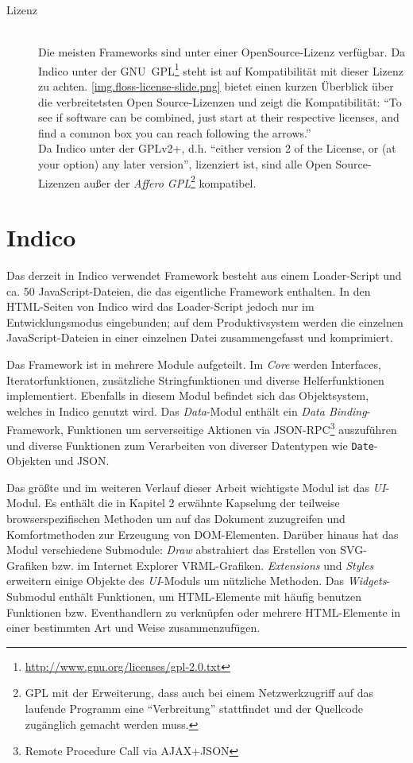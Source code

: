 \begin{description}
\item[Lizenz] \hfill \\
Die meisten Frameworks sind unter einer OpenSource-Lizenz verfügbar.
Da Indico unter der
GNU~GPL\footnote{\href{http://www.gnu.org/licenses/gpl-2.0.txt}{http://www.gnu.org/licenses/gpl-2.0.txt}}
steht ist auf Kompatibilität mit dieser Lizenz zu achten. \autoref{img.floss-license-slide.png}
bietet einen kurzen Überblick über die verbreitetsten Open Source-Lizenzen und zeigt die
Kompatibilität: \enquote{To see if software can be combined, just start at their respective
licenses, and find a common box you can reach following the arrows.} \citep{osslic} \\
Da Indico unter der GPLv2+, d.h. \enquote{either version 2 of the License, or (at your option) any
later version}, lizenziert ist, sind alle Open Source-Lizenzen außer der \emph{Affero
GPL}\footnote{GPL mit der Erweiterung, dass auch bei einem Netzwerkzugriff auf das laufende Programm
eine \enquote{Verbreitung} stattfindet und der Quellcode zugänglich gemacht werden muss.}
kompatibel.
\end{description}



\section{Indico}
Das derzeit in Indico verwendet Framework besteht aus einem Loader-Script und ca. 50
JavaScript-Dateien, die das eigentliche Framework enthalten. In den HTML-Seiten von Indico wird das
Loader-Script jedoch nur im Entwicklungsmodus eingebunden; auf dem Produktivsystem werden die
einzelnen JavaScript-Dateien in einer einzelnen Datei zusammengefasst und komprimiert.

Das Framework ist in mehrere Module aufgeteilt. Im \emph{Core} werden Interfaces,
Iteratorfunktionen, zusätzliche Stringfunktionen und diverse Helferfunktionen implementiert.
Ebenfalls in diesem Modul befindet sich das Objektsystem, welches in Indico genutzt wird.
Das \emph{Data}-Modul enthält ein \emph{Data Binding}-Framework, Funktionen um serverseitige
Aktionen via JSON-RPC\footnote{Remote Procedure Call via AJAX+JSON} auszuführen und diverse
Funktionen zum Verarbeiten von diverser Datentypen wie \lstinline{Date}-Objekten und JSON.

Das größte und im weiteren Verlauf dieser Arbeit wichtigste Modul ist das \emph{UI}-Modul.
Es enthält die in Kapitel 2 erwähnte Kapselung der teilweise browserspezifischen Methoden um auf das
Dokument zuzugreifen und Komfortmethoden zur Erzeugung von DOM-Elementen. Darüber hinaus hat das
Modul verschiedene Submodule: \emph{Draw} abstrahiert das Erstellen von SVG-Grafiken bzw. im
Internet Explorer VRML-Grafiken. \emph{Extensions} und \emph{Styles} erweitern einige Objekte des
\emph{UI}-Moduls um nützliche Methoden. Das \emph{Widgets}-Submodul enthält Funktionen, um
HTML-Elemente mit häufig benutzen Funktionen bzw. Eventhandlern zu verknüpfen oder mehrere
HTML-Elemente in einer bestimmten Art und Weise zusammenzufügen.

